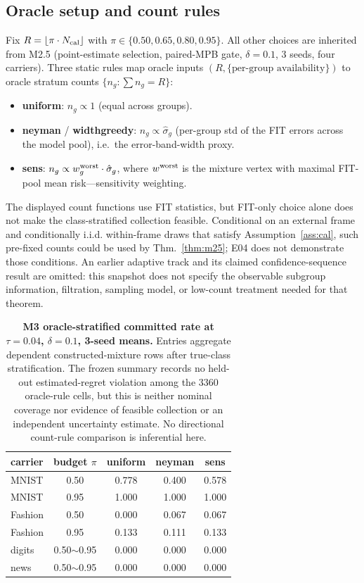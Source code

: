 \documentclass{article}
\begin{document}
\subsection{Oracle setup and count rules}
Fix $R=\lfloor \pi \cdot N_{\rm cal}\rfloor$ with $\pi\in\{0.50,0.65,0.80,0.95\}$. All other
choices are inherited from M2.5 (point-estimate selection, paired-MPB gate, $\delta{=}0.1$,
3 seeds, four carriers). Three static rules map oracle inputs
$(R,\{\text{per-group availability}\})$ to oracle stratum counts $\{n_g:\sum n_g=R\}$:
\begin{itemize}
\item \textbf{uniform}: $n_g\propto 1$ (equal across groups).
\item \textbf{neyman} / \textbf{widthgreedy}: $n_g\propto \hat\sigma_g$ (per-group std of the
FIT errors across the model pool), i.e.\ the error-band-width proxy.
\item \textbf{sens}: $n_g\propto w^{\rm worst}_g \cdot \hat\sigma_g$, where $w^{\rm worst}$ is
the mixture vertex with maximal FIT-pool mean risk---sensitivity weighting.
\end{itemize}
The displayed count functions use FIT statistics, but FIT-only choice alone does not make the
class-stratified collection feasible. Conditional on an external frame and conditionally i.i.d.
within-frame draws that satisfy Assumption~\ref{ass:cal}, such pre-fixed counts could be used by
Thm.~\ref{thm:m25}; E04 does not demonstrate those conditions. An earlier adaptive track and its
claimed confidence-sequence result are omitted: this snapshot does not specify the observable
subgroup information, filtration, sampling model, or low-count treatment needed for that theorem.

\FloatBarrier
\begin{table}[H]
\centering\small\setlength{\tabcolsep}{5pt}
\begin{tabular}{lcccc}
\toprule
carrier & budget $\pi$ & uniform & neyman & sens \\
\midrule
MNIST & 0.50 & 0.778 & 0.400 & 0.578 \\
MNIST & 0.95 & 1.000 & 1.000 & 1.000 \\
Fashion & 0.50 & 0.000 & 0.067 & 0.067 \\
Fashion & 0.95 & 0.133 & 0.111 & 0.133 \\
digits & 0.50$\sim$0.95 & 0.000 & 0.000 & 0.000 \\
news & 0.50$\sim$0.95 & 0.000 & 0.000 & 0.000 \\
\bottomrule
\end{tabular}
\caption{\textbf{M3 oracle-stratified committed rate at $\tau{=}0.04$, $\delta{=}0.1$, 3-seed means.}
Entries aggregate dependent constructed-mixture rows after true-class stratification. The frozen
summary records no held-out estimated-regret violation among the $3360$ oracle-rule cells, but
this is neither nominal coverage nor evidence of feasible collection or an independent uncertainty
estimate. No directional count-rule comparison is inferential here.}
\label{tab:m3}
\end{table}
\end{document}
